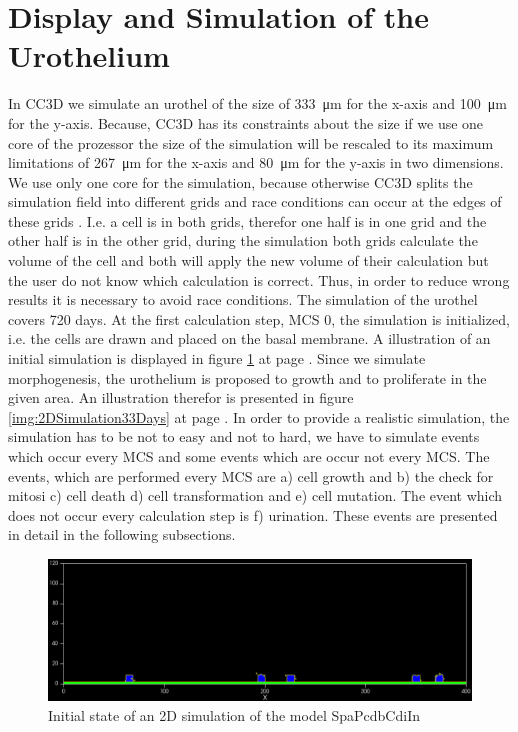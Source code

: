 \section{Display and Simulation of the Urothelium}
In \ac{CC3D} we simulate an urothel of the size of \SI{333}{\micro\metre} for the x-axis and \SI{100}{\micro\metre} for the y-axis. Because, \ac{CC3D} has its constraints about the size if we use one core of the prozessor the size of the simulation will be rescaled to its maximum limitations of \SI{267}{\micro\metre} for the x-axis and \SI{80}{\micro\metre} for the y-axis in two dimensions. We use only one core for the simulation, because otherwise \ac{CC3D} splits the simulation field into different grids and race conditions can occur at the edges of these grids \cite{MaciejH.Swat2017}. I.e. a cell is in both grids, therefor one half is in one grid and the other half is in the other grid, during the simulation both grids calculate the volume of the cell and both will apply the new volume of their calculation but the user do not know which calculation is correct. Thus, in order to reduce wrong results it is necessary to avoid race conditions. \newline 
The simulation of the urothel covers 720 days. At the first calculation step, \ac{MCS} 0, the simulation is initialized, i.e. the cells are drawn and placed on the basal membrane. A illustration of an initial simulation is displayed in figure \ref{img:2DSimulationInitialState} at page \pageref{img:2DSimulationInitialState}. Since we simulate morphogenesis, the urothelium is proposed to growth and to proliferate in the given area. An illustration therefor is presented in figure \ref{img:2DSimulation33Days} at page \pageref{img:2DSimulation33Days}. \newline
In order to provide a realistic simulation, the simulation has to be not to easy and not to hard, we have to simulate events which occur every \ac{MCS} and some events which are occur not every \ac{MCS}. The events, which are performed every \ac{MCS} are a) cell growth and b) the check for mitosi c) cell death d) cell transformation and e) cell mutation. The event which does not occur every calculation step is f) urination. These events are presented in detail in the following subsections.

\begin{figure}
	\center
	\includegraphics[scale=0.35]{figures/2DSimulation-InitialState.png}
	\caption{Initial state of an 2D simulation of the model SpaPcdbCdiIn}
	\label{img:2DSimulationInitialState}
\end{figure}

